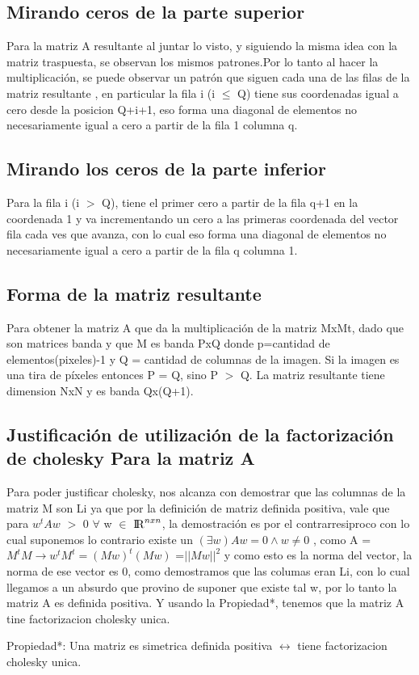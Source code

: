 \subsection{Mirando ceros de la parte superior} 
Para la matriz A resultante al juntar lo visto, y siguiendo la misma idea con la matriz traspuesta, se observan los mismos patrones.Por lo tanto al hacer la multiplicación, se puede observar un patrón que siguen cada una de las filas de la matriz resultante , en particular la fila i (i $\leq$ Q) tiene sus coordenadas igual a cero desde la posicion Q+i+1, eso forma una diagonal de elementos no necesariamente igual a cero a partir de la fila 1 columna q.

\subsection{Mirando los ceros de la parte inferior} 
Para la fila i (i $>$ Q), tiene el primer cero a partir de la fila q+1 en la coordenada 1  y va incrementando un cero a las primeras coordenada del vector fila cada ves que avanza, con lo cual eso forma una diagonal de elementos no necesariamente igual a cero a partir de la fila q columna 1.

\subsection{Forma de la matriz resultante}
Para obtener la matriz A que da la multiplicación de la matriz MxMt, dado que son matrices banda y que M es banda PxQ donde p=cantidad de elementos(pixeles)-1 y Q = cantidad de columnas de la imagen. Si la imagen es una tira de píxeles entonces P = Q, sino P $>$ Q.
La matriz resultante tiene dimension NxN y es banda Qx(Q+1). 

\subsection{Justificación de utilización de la factorización de cholesky Para la matriz A}

Para poder justificar cholesky, nos alcanza con demostrar que las columnas de la matriz M son Li ya que por la definición de matriz definida positiva, vale que para $w^{t}Aw$ $>$ 0 $\forall$ w $\in$ ${\rm I\!R}^{nxn}$, la demostración es por el contrarresiproco con lo cual suponemos lo contrario existe un $(\exists w ) Aw = 0 \land w \neq 0 $ , como A = $ M^{t}M \rightarrow w^{t}M^{t}=(Mw)^{t}(Mw)$ =$||Mw||^{2}$ y como esto es la norma del vector, la norma de ese vector es 0, como demostramos que las columas eran Li, con lo cual llegamos a un absurdo que provino de suponer que existe tal w, por lo tanto la matriz A es definida positiva. Y usando la Propiedad*, tenemos que la matriz A tine factorizacion cholesky unica.

Propiedad*: Una matriz es simetrica definida positiva $\leftrightarrow$ tiene factorizacion cholesky unica.



